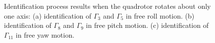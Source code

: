 \documentclass[3p]{elsarticle}
\begin{document}
\begin{figure}[H]
{    }
    \hfil
    \caption{Identification process results when the quadrotor rotates about only one axis: (a) identification of $\Gamma_3$ and $\Gamma_5$ in free roll motion. (b) identification of $\Gamma_8$ and $\Gamma_9$ in free pitch motion. (c) identification of $\Gamma_{11}$
    in free yaw motion.}
    \label{fig:one_degree_identification}
\end{figure}
\end{document}
